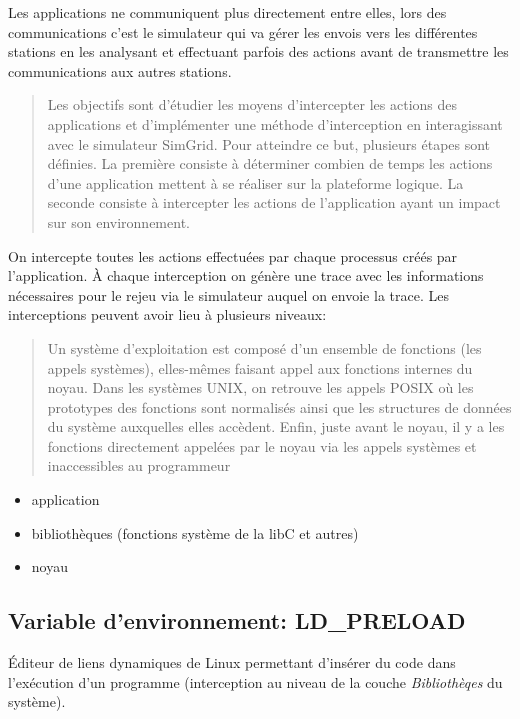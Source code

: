 \documentclass{article}
\begin{document}
Les applications ne communiquent plus directement entre elles, lors des
communications c'est le simulateur qui va gérer les envois vers les différentes
stations en les analysant et effectuant parfois des actions avant de transmettre
les communications aux autres stations.

\begin{quotation}
Les objectifs sont d’étudier les moyens d’intercepter les actions des
applications et d’implémenter une méthode d’interception en interagissant avec
le simulateur SimGrid. Pour atteindre ce but, plusieurs étapes sont définies. La
première consiste à déterminer combien de temps les actions d’une application
mettent à se réaliser sur la plateforme logique. La seconde consiste à
intercepter les actions de l’application ayant un impact sur son environnement.
\end{quotation}
On intercepte toutes les actions effectuées par chaque processus créés par
l'application. À chaque interception on génère une trace avec les informations
nécessaires pour le rejeu via le simulateur auquel on envoie la trace. Les
interceptions peuvent avoir lieu à plusieurs niveaux:

\begin{quotation}
{\color{green} Un système d’exploitation est composé d’un ensemble de fonctions
  (les appels systèmes), elles-mêmes faisant appel aux fonctions internes du
  noyau. Dans les systèmes UNIX, on retrouve les appels POSIX où les prototypes
  des fonctions sont normalisés ainsi que les structures de données du système
  auxquelles elles accèdent. Enfin, juste avant le noyau, il y a les fonctions
  directement appelées par le noyau via les appels systèmes et inaccessibles au
  programmeur }
\end{quotation}

\begin{itemize}
\item application
\item bibliothèques (fonctions système de la libC et autres)
\item noyau
\end{itemize}

\subsection{Variable d'environnement: LD\_PRELOAD}
Éditeur de liens dynamiques de Linux permettant d'insérer du code dans
l'exécution d'un programme (interception au niveau de la couche
\textit{Bibliothèqes} du système).
\end{document}

